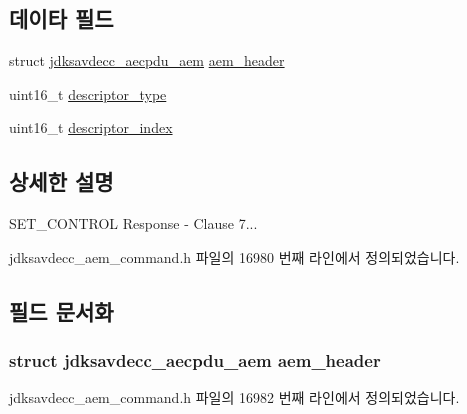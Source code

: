 \subsection*{데이타 필드}
\begin{DoxyCompactItemize}
\item 
struct \hyperlink{structjdksavdecc__aecpdu__aem}{jdksavdecc\+\_\+aecpdu\+\_\+aem} \hyperlink{structjdksavdecc__aem__command__set__control__response_ae1e77ccb75ff5021ad923221eab38294}{aem\+\_\+header}
\item 
uint16\+\_\+t \hyperlink{structjdksavdecc__aem__command__set__control__response_ab7c32b6c7131c13d4ea3b7ee2f09b78d}{descriptor\+\_\+type}
\item 
uint16\+\_\+t \hyperlink{structjdksavdecc__aem__command__set__control__response_a042bbc76d835b82d27c1932431ee38d4}{descriptor\+\_\+index}
\end{DoxyCompactItemize}


\subsection{상세한 설명}
S\+E\+T\+\_\+\+C\+O\+N\+T\+R\+OL Response -\/ Clause 7... 

jdksavdecc\+\_\+aem\+\_\+command.\+h 파일의 16980 번째 라인에서 정의되었습니다.



\subsection{필드 문서화}
\subsubsection[{\texorpdfstring{aem\+\_\+header}{aem_header}}]{\setlength{\rightskip}{0pt plus 5cm}struct {\bf jdksavdecc\+\_\+aecpdu\+\_\+aem} aem\+\_\+header}\hypertarget{structjdksavdecc__aem__command__set__control__response_ae1e77ccb75ff5021ad923221eab38294}{}\label{structjdksavdecc__aem__command__set__control__response_ae1e77ccb75ff5021ad923221eab38294}


jdksavdecc\+\_\+aem\+\_\+command.\+h 파일의 16982 번째 라인에서 정의되었습니다.

